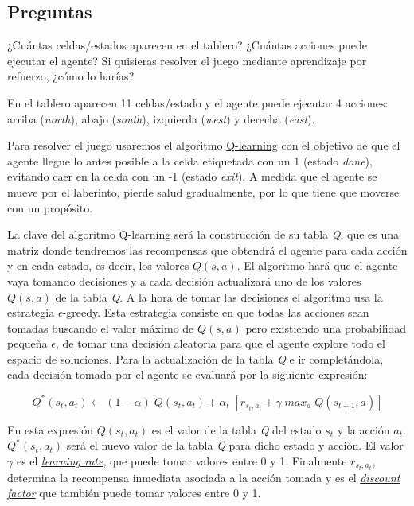 \documentclass[11pt]{exam}
\begin{document}
\subsection*{Preguntas}

\begin{questions}
	
{ \question ¿Cuántas celdas/estados aparecen en el tablero? ¿Cuántas acciones puede ejecutar el agente? Si quisieras resolver el juego mediante aprendizaje por refuerzo, ¿cómo lo harías? 
}

En el tablero aparecen 11 celdas/estado y el agente puede ejecutar 4 acciones: arriba (\textit{north}), abajo (\textit{south}), izquierda (\textit{west}) y derecha (\textit{east}).

Para resolver el juego usaremos el algoritmo \href{https://en.wikipedia.org/wiki/Q-learning}{Q-learning} con el objetivo de que el agente llegue lo antes posible a la celda etiquetada con un 1 (estado \textit{done}), evitando caer en la celda con un -1 (estado \textit{exit}). A medida que el agente se mueve por el laberinto, pierde salud gradualmente, por lo que tiene que moverse con un propósito.

La clave del algoritmo Q-learning será la construcción de su tabla \textit{Q}, que es una matriz donde tendremos las recompensas que obtendrá el agente para cada acción y en cada estado, es decir, los valores $Q(s,a)$. El algoritmo hará que el agente vaya tomando decisiones y a cada decisión actualizará uno de los valores $Q(s,a)$ de la tabla \textit{Q}. A la hora de tomar las decisiones el algoritmo usa la estrategia \textit{$\epsilon$}-greedy. Esta estrategia consiste en que todas las acciones sean tomadas buscando el valor máximo de $Q(s,a)$ pero existiendo una probabilidad pequeña \textit{$\epsilon$}, de tomar una decisión aleatoria para que el agente explore todo el espacio de soluciones. Para la actualización de la tabla \textit{Q} e ir completándola, cada decisión tomada por el agente se evaluará por la siguiente expresión:

\begin{equation}
	Q^*(s_{t}, a_{t}) \leftarrow (1-\alpha) \; Q(s_{t}, a_{t}) + \alpha_{t} \; [r_{s_{t}, a_{t}} + \gamma \; max_{a} \; Q(s_{t + 1}, a)]
\end{equation}

En esta expresión $Q(s_{t}, a_{t})$ es el valor de la tabla \textit{Q} del estado $s_{t}$ y la acción $ a_{t}$. $Q^*(s_{t}, a_{t})$ será el nuevo valor de la tabla \textit{Q} para dicho estado y acción. El valor $\gamma$ es el \href{https://en.wikipedia.org/wiki/Learning_rate}{\textit{learning rate}}, que puede tomar valores entre 0 y 1. Finalmente $r_{s_{t}, a_{t}}$, determina la recompensa inmediata asociada a la acción tomada y es el \href{https://en.wikipedia.org/wiki/Discounting#Discount_factor}{\textit{discount factor}} que también puede tomar valores entre 0 y 1.


\end{questions}
\end{document}
